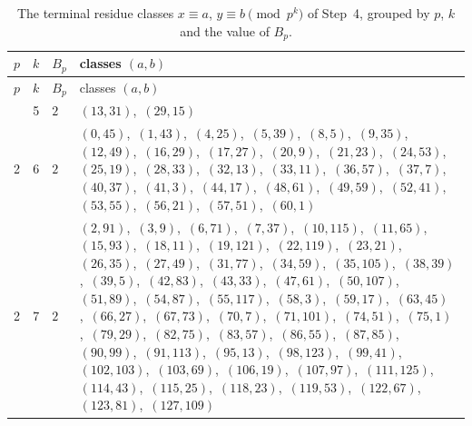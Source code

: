 \documentclass[11pt]{article}
\begin{document}
\begingroup\small
\setlength{\LTcapwidth}{\textwidth}
\begin{longtable}{@{}rrl>{\raggedright\arraybackslash}p{}@{}}
\caption{The terminal residue classes $x\equiv a$, $y\equiv b\pmod{p^k}$ of Step~4, grouped by $p$, $k$ and the value of $B_p$.}\label{tab:local}\\
\hline $p$ & $k$ & $B_p$ & classes $(a,b)$\\\hline\endfirsthead
\hline $p$ & $k$ & $B_p$ & classes $(a,b)$\\\hline\endhead\hline\endfoot
2 & 5 & $2$ & $(13,31)$,\allowbreak\ $(29,15)$\\
2 & 6 & $2$ & $(0,45)$,\allowbreak\ $(1,43)$,\allowbreak\ $(4,25)$,\allowbreak\ $(5,39)$,\allowbreak\ $(8,5)$,\allowbreak\ $(9,35)$,\allowbreak\ $(12,49)$,\allowbreak\ $(16,29)$,\allowbreak\ $(17,27)$,\allowbreak\ $(20,9)$,\allowbreak\ $(21,23)$,\allowbreak\ $(24,53)$,\allowbreak\ $(25,19)$,\allowbreak\ $(28,33)$,\allowbreak\ $(32,13)$,\allowbreak\ $(33,11)$,\allowbreak\ $(36,57)$,\allowbreak\ $(37,7)$,\allowbreak\ $(40,37)$,\allowbreak\ $(41,3)$,\allowbreak\ $(44,17)$,\allowbreak\ $(48,61)$,\allowbreak\ $(49,59)$,\allowbreak\ $(52,41)$,\allowbreak\ $(53,55)$,\allowbreak\ $(56,21)$,\allowbreak\ $(57,51)$,\allowbreak\ $(60,1)$\\
2 & 7 & $2$ & $(2,91)$,\allowbreak\ $(3,9)$,\allowbreak\ $(6,71)$,\allowbreak\ $(7,37)$,\allowbreak\ $(10,115)$,\allowbreak\ $(11,65)$,\allowbreak\ $(15,93)$,\allowbreak\ $(18,11)$,\allowbreak\ $(19,121)$,\allowbreak\ $(22,119)$,\allowbreak\ $(23,21)$,\allowbreak\ $(26,35)$,\allowbreak\ $(27,49)$,\allowbreak\ $(31,77)$,\allowbreak\ $(34,59)$,\allowbreak\ $(35,105)$,\allowbreak\ $(38,39)$,\allowbreak\ $(39,5)$,\allowbreak\ $(42,83)$,\allowbreak\ $(43,33)$,\allowbreak\ $(47,61)$,\allowbreak\ $(50,107)$,\allowbreak\ $(51,89)$,\allowbreak\ $(54,87)$,\allowbreak\ $(55,117)$,\allowbreak\ $(58,3)$,\allowbreak\ $(59,17)$,\allowbreak\ $(63,45)$,\allowbreak\ $(66,27)$,\allowbreak\ $(67,73)$,\allowbreak\ $(70,7)$,\allowbreak\ $(71,101)$,\allowbreak\ $(74,51)$,\allowbreak\ $(75,1)$,\allowbreak\ $(79,29)$,\allowbreak\ $(82,75)$,\allowbreak\ $(83,57)$,\allowbreak\ $(86,55)$,\allowbreak\ $(87,85)$,\allowbreak\ $(90,99)$,\allowbreak\ $(91,113)$,\allowbreak\ $(95,13)$,\allowbreak\ $(98,123)$,\allowbreak\ $(99,41)$,\allowbreak\ $(102,103)$,\allowbreak\ $(103,69)$,\allowbreak\ $(106,19)$,\allowbreak\ $(107,97)$,\allowbreak\ $(111,125)$,\allowbreak\ $(114,43)$,\allowbreak\ $(115,25)$,\allowbreak\ $(118,23)$,\allowbreak\ $(119,53)$,\allowbreak\ $(122,67)$,\allowbreak\ $(123,81)$,\allowbreak\ $(127,109)$\\

\end{longtable}
\end{document}
